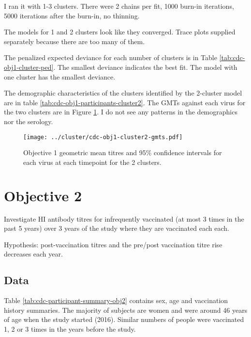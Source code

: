 \documentclass[12pt]{article}
\begin{document}
I ran it with 1-3 clusters. There were 2 chains per fit, 1000 burn-in iterations, 5000 iterations after the burn-in, no thinning.

The models for 1 and 2 clusters look like they converged. Trace plots supplied separately because there are too many of them.

The penalized expected deviance for each number of clusters is in Table \ref{tab:cdc-obj1-cluster-ped}. The smallest deviance indicates the best fit. The model with one cluster has the smallest deviance.



The demographic characteristics of the clusters identified by the 2-cluster
model are in table \ref{tab:cdc-obj1-participants-cluster2}. The GMTs against
each virus for the two clusters are in Figure \ref{fig:cdc-obj1-cluster2-gmts}.
I do not see any patterns in the demographics nor the serology.



\begin{figure}
	\texttt{[image: ../cluster/cdc-obj1-cluster2-gmts.pdf]}
	\caption{Objective 1 geometric mean titres and 95\% confidence intervals for each virus at each timepoint for the 2 clusters.}
	\label{fig:cdc-obj1-cluster2-gmts}
\end{figure}

\section{Objective 2}

Investigate HI antibody titres for infrequently vaccinated (at most 3 times in the past 5 years) over 3 years of the study where
they are vaccinated each each.

Hypothesis: post-vaccination titres and the pre/post vaccination titre rise
decreases each year.

\subsection{Data}

Table \ref{tab:cdc-participant-summary-obj2} contains sex, age and
vaccination history summaries.
The majority of subjects are
women and were around 46 years of age when the study started (2016).
Similar numbers of people were vaccinated 1, 2 or 3 times in the years before
the study.
\end{document}
